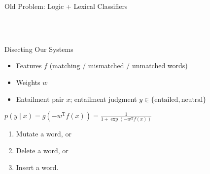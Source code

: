 \def\title{Old Problem: Logic + Lexical Classifiers}
\begin{frame}{\title}
\begin{center}
 \\
 \\
\vspace{2ex}
\end{center}
\end{frame}



\def\title{Disecting Our Systems}
\begin{frame}{\title}
\begin{itemize}
\item Features $f$ (matching / mismatched / unmatched words)
\item Weights $w$
\item Entailment pair $x$; entailment judgment $y \in \{\textrm{entailed}, \textrm{neutral}\}$
\end{itemize}

\begin{center}
$p(y \mid x) 
  = g\left(- w^{\textrm{T}} f(x)\right)
  = \frac{1}{1 + \exp({- w^{\textrm{T}} f(x)})}$
\end{center}
\pause
\vspace{1ex}

\begin{enumerate}
\item Mutate a word, or
\item Delete a word, or
\item Insert a word.
\end{enumerate}
\pause
\vspace{1ex}

\begin{center}
\end{center}
\end{frame}



